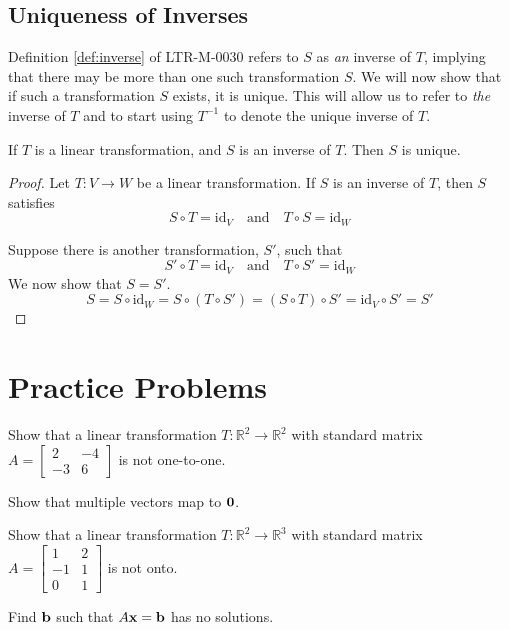 \documentclass{ximera}
\renewcommand{\vec}[1]{{\bf #1}}
\newcommand{\RR}{\mathbb{R}}
\newcommand{\dfn}{\textit}
\newcommand{\id}{\text{id}}
\begin{document}
\subsection*{Uniqueness of Inverses}

Definition \ref{def:inverse} of LTR-M-0030 refers to $S$ as \dfn{an} inverse of $T$, implying that there may be more than one such transformation $S$.  We will now show that if such a transformation $S$ exists, it is unique.  This will allow us to refer to {\it the} inverse of $T$ and to start using $T^{-1}$ to denote the unique inverse of $T$.

\begin{theorem}\label{th:inverseisunique}
If $T$ is a linear transformation, and $S$ is an inverse of $T$.  Then $S$ is unique.
\end{theorem}
\begin{proof}
Let $T:V\rightarrow W$ be a linear transformation.  If $S$ is an inverse of $T$, then $S$ satisfies
$$S\circ T=\id_V\quad \text{and}\quad T\circ S=\id_W$$

Suppose there is another transformation, $S'$, such that 
$$S'\circ T=\id_V\quad \text{and}\quad T\circ S'=\id_W$$
We now show that $S=S'$.
$$S=S\circ \id_W=S\circ(T\circ S')=(S\circ T)\circ S'=\id_V\circ S'=S'$$
\end{proof}

\section*{Practice Problems}
\begin{problem}
Show that a linear transformation $T:\RR^2\rightarrow \RR^2$ with standard matrix $A=\begin{bmatrix}2&-4\\-3&6\end{bmatrix}$ is not one-to-one.
\begin{hint}
        Show that multiple vectors map to $\vec{0}$.
      \end{hint}
\end{problem}
 
 \begin{problem}
 Show that a linear transformation $T:\RR^2\rightarrow \RR^3$ with standard matrix $A=\begin{bmatrix}1&2\\-1&1\\0&1\end{bmatrix}$ is not onto.
 \begin{hint}
 Find $\vec{b}$ such that $A\vec{x}=\vec{b}$ has no solutions.
 \end{hint}
 \end{problem}
 
\end{document}
